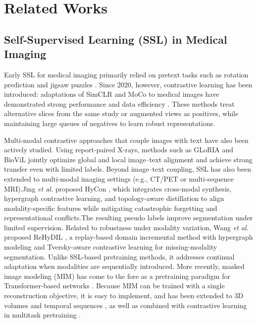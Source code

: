 \documentclass[final,1p,times]{elsarticle}
\newcommand{\revadd}[1]{#1}
\begin{document}
\section{Related Works}
\subsection{Self‑Supervised Learning (SSL) in Medical Imaging}
Early SSL for medical imaging primarily relied on pretext tasks such as rotation prediction and jigsaw puzzles \cite{li_rotation-oriented_2021}\cite{sugawara_breast_2025}. Since 2020, however, contrastive learning has been introduced: adaptations of SimCLR \cite{chen2020simple} and MoCo \cite{he_momentum_2020} to medical images have demonstrated strong performance and data efficiency \cite{ren_ukssl_2023}\cite{sowrirajan_moco_2021}\revadd{\cite{fan_cancer_2023}}.
These methods treat alternative slices from the same study or augmented views as positives, while maintaining large queues of negatives to learn robust representations.

Multi‑modal contrastive approaches that couple images with text have also been actively studied.
Using report‑paired X‑rays, methods such as GLoRIA \cite{huang_gloria_2021} and BioViL \cite{boecking_making_2022} jointly optimize global and local image–text alignment and achieve strong transfer even with limited labels.
\revadd{Beyond image–text coupling, SSL has also been extended to multi-modal imaging settings (e.g., CT/PET or multi-sequence MRI).Jing \emph{et al.} proposed HyCon \cite{jing_multi-modal_2025}, which integrates cross-modal synthesis, hypergraph contrastive learning, and topology-aware distillation to align modality-specific features while mitigating catastrophic forgetting and representational conflicts.The resulting pseudo labels improve segmentation under limited supervision.}
\revadd{Related to robustness under modality variation, Wang \emph{et al.} proposed ReHyDIL \cite{wang_hypergraph_2025}, a replay-based domain incremental method with hypergraph modeling and Tversky-aware contrastive learning for missing-modality segmentation. }
Unlike SSL-based pretraining methods, it addresses continual adaptation when modalities are sequentially introduced.
More recently, masked image modeling (MIM) has come to the fore as a pretraining paradigm for Transformer‑based networks \cite{zhou_self_2023}\cite{zhuang_advancing_2025}\cite{xu_swin_2023}.
Because MIM can be trained with a single reconstruction objective, it is easy to implement, and has been extended to 3D volumes \cite{yu_unest_2023} and temporal sequences \cite{buess_video-ct_2024}, as well as combined with contrastive learning in multitask pretraining \cite{tang2022self}.
\end{document}
